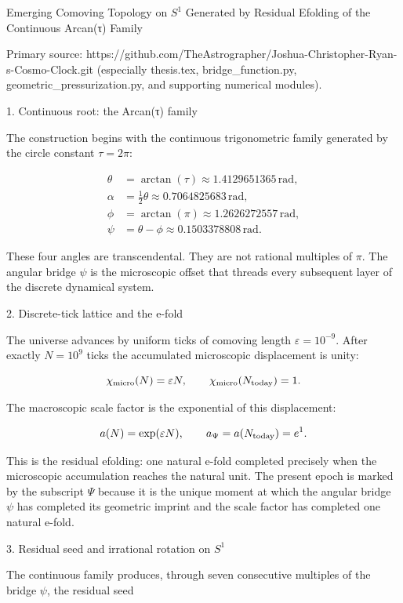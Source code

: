 Emerging Comoving Topology on \(S^1\) Generated by Residual Efolding of the Continuous Arcan(τ) Family

Primary source:  
https://github.com/TheAstrographer/Joshua-Christopher-Ryan-s-Cosmo-Clock.git  
(especially thesis.tex, bridge_function.py, geometric_pressurization.py, and supporting numerical modules).

1. Continuous root: the Arcan(τ) family

The construction begins with the continuous trigonometric family generated by the circle constant \(\tau=2\pi\):

\[
\begin{align*}
\theta &= \arctan(\tau) \approx 1.4129651365\,\text{rad},\\
\alpha &= \tfrac12\theta \approx 0.7064825683\,\text{rad},\\
\phi &= \arctan(\pi) \approx 1.2626272557\,\text{rad},\\
\psi &= \theta-\phi \approx 0.1503378808\,\text{rad}.
\end{align*}
\]

These four angles are transcendental. They are not rational multiples of \(\pi\). The angular bridge \(\psi\) is the microscopic offset that threads every subsequent layer of the discrete dynamical system.

2. Discrete-tick lattice and the e-fold

The universe advances by uniform ticks of comoving length \(\varepsilon=10^{-9}\). After exactly \(N=10^9\) ticks the accumulated microscopic displacement is unity:

\[
\chi_{\rm micro}(N)=\varepsilon N,\qquad
\chi_{\rm micro}(N_{\rm today})=1.
\]

The macroscopic scale factor is the exponential of this displacement:

\[
a(N)=\exp(\varepsilon N),\qquad
a_{\Psi}=a(N_{\rm today})=e^{1}.
\]

This is the residual efolding: one natural e-fold completed precisely when the microscopic accumulation reaches the natural unit. The present epoch is marked by the subscript \(\Psi\) because it is the unique moment at which the angular bridge \(\psi\) has completed its geometric imprint and the scale factor has completed one natural e-fold.

3. Residual seed and irrational rotation on \(S^1\)

The continuous family produces, through seven consecutive multiples of the bridge \(\psi\), the residual seed

